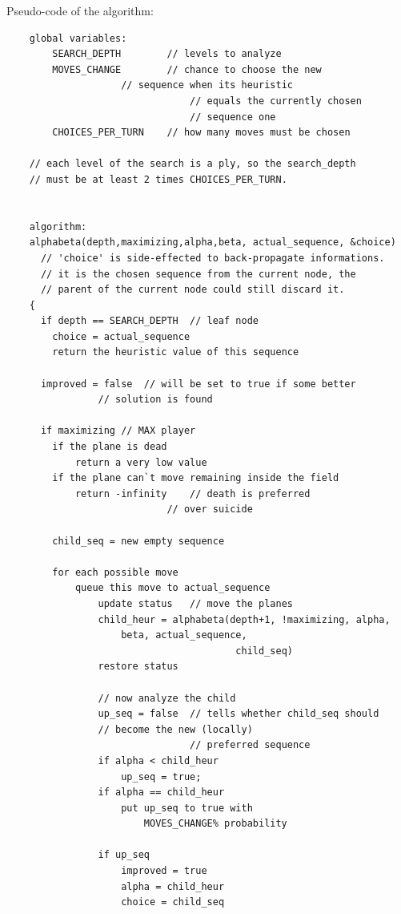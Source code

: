 Pseudo-code of the algorithm:
{\footnotesize
  \lstset{language=C}
  \begin{lstlisting}
    global variables:
    	SEARCH_DEPTH		// levels to analyze
        MOVES_CHANGE		// chance to choose the new
        			// sequence when its heuristic
                                // equals the currently chosen
                                // sequence one
        CHOICES_PER_TURN	// how many moves must be chosen
    
    // each level of the search is a ply, so the search_depth
    // must be at least 2 times CHOICES_PER_TURN.
    
    
    algorithm:
    alphabeta(depth,maximizing,alpha,beta, actual_sequence, &choice)
      // 'choice' is side-effected to back-propagate informations.
      // it is the chosen sequence from the current node, the
      // parent of the current node could still discard it.
    { 
      if depth == SEARCH_DEPTH	// leaf node
      	choice = actual_sequence
        return the heuristic value of this sequence
      
      improved = false	// will be set to true if some better
      			// solution is found
      
      if maximizing	// MAX player
      	if the plane is dead
        	return a very low value
        if the plane can`t move remaining inside the field
        	return -infinity	// death is preferred
                			// over suicide
        
        child_seq = new empty sequence
        
        for each possible move
        	queue this move to actual_sequence
                update status	// move the planes
                child_heur = alphabeta(depth+1, !maximizing, alpha,
					beta, actual_sequence,
                                        child_seq)
                restore status
        	
                // now analyze the child
                up_seq = false	// tells whether child_seq should
				// become the new (locally)
                                // preferred sequence
                if alpha < child_heur
                	up_seq = true;
                if alpha == child_heur
                	put up_seq to true with
                        MOVES_CHANGE% probability
                        
                if up_seq
                	improved = true
                	alpha = child_heur
                	choice = child_seq
                

\end{lstlisting}}
